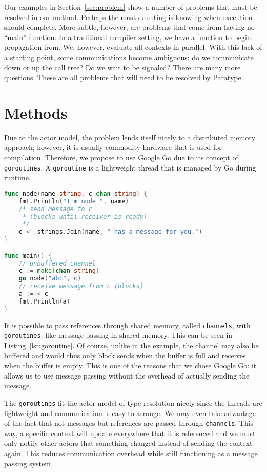 \documentclass{acm_proc_article-sp}
\begin{document}
Our examples in Section~\ref{sec:problem} show a number of problems that must be
resolved in our method. Perhaps the most daunting is knowing when
execution should complete. More subtle, however, are problems that
come from having no ``main'' function. In a traditional compiler
setting, we have a function to begin propagation from. We, however,
evaluate all contexts in parallel. With this lack of a starting point,
some communications become ambiguous: do we communicate down or up
the call tree? Do we wait to be signaled? There are many more questions. These
are all problems that will need to be resolved by Paratype.

\section{Methods}


Due to the actor model, the problem lends itself nicely to a distributed memory
approach; however, it is usually commodity hardware that is used for
compilation. Therefore, we propose to use Google Go due to its concept of
\texttt{goroutines}. A \texttt{goroutine} is a lightweight thread that is
managed by Go during runtime.

\begin{lstlisting}[caption=Small \texttt{goroutine} example with
\texttt{channels},language=Go,label=lst:goroutine]
func node(name string, c chan string) {
	fmt.Println("I'm node ", name)
	/* send message to c
	 * (blocks until receiver is ready)
	 */
	c <- strings.Join(name, " has a message for you.")
}

func main() {
	// unbuffered channel
	c := make(chan string)
	go node("abc", c)
	// receive message from c (blocks)
	a := <-c
	fmt.Println(a)
}
\end{lstlisting}

It is possible to pass references through shared memory, called
\texttt{channels}, with \texttt{goroutines}: like message passing in shared
memory. This can be seen in Listing~\ref{lst:goroutine}. Of course, unlike in
the example, the channel may also be buffered and would thus only block sends
when the buffer is full and receives when the buffer is empty. This is one of
the reasons that we chose Google Go: it allows us to use message passing
without the overhead of actually sending the message.

The \texttt{goroutines} fit the actor model of type resolution nicely since
the threads are lightweight and communication is easy to arrange. We may even
take advantage of the fact that not messages but references are passed through
\texttt{channels}. This way, a specific context will update everywhere that it
is referenced and we must only notify other actors that something changed
instead of sending the context again. This reduces communication overhead while
still functioning as a message passing system.
\end{document}
